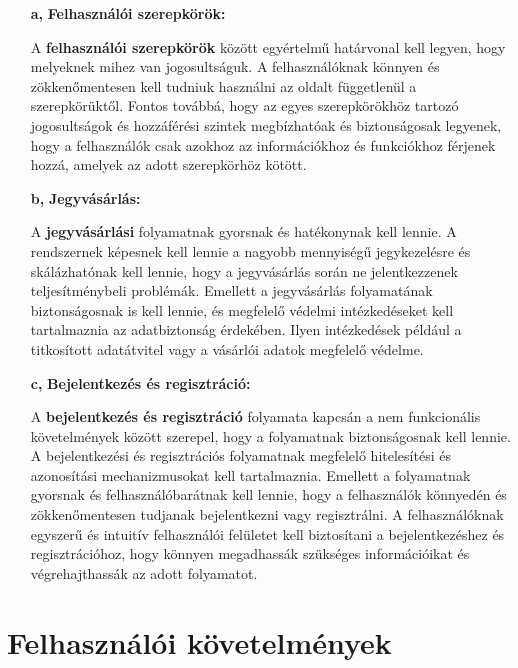 \begin{itemize}
  	\item[\textbf{a,}] \textbf{Felhasználói szerepkörök:}

A \textbf{felhasználói szerepkörök} között egyértelmű határvonal kell legyen, hogy melyeknek mihez van jogosultságuk. A felhasználóknak könnyen és zökkenőmentesen kell tudniuk használni az oldalt függetlenül a szerepkörüktől. Fontos továbbá, hogy az egyes szerepkörökhöz tartozó jogosultságok és hozzáférési szintek megbízhatóak és biztonságosak legyenek, hogy a felhasználók csak azokhoz az információkhoz és funkciókhoz férjenek hozzá, amelyek az adott szerepkörhöz kötött.

 	 \item[\textbf{b,}] \textbf{Jegyvásárlás:}

A \textbf{jegyvásárlási} folyamatnak gyorsnak és hatékonynak kell lennie. A rendszernek képesnek kell lennie a nagyobb mennyiségű jegykezelésre és skálázhatónak kell lennie, hogy a jegyvásárlás során ne jelentkezzenek teljesítménybeli problémák. Emellett a jegyvásárlás folyamatának biztonságosnak is kell lennie, és megfelelő védelmi intézkedéseket kell tartalmaznia az adatbiztonság érdekében. Ilyen intézkedések például a titkosított adatátvitel vagy a vásárlói adatok megfelelő védelme.

	 \item[\textbf{c,}] \textbf{Bejelentkezés és regisztráció:}

A \textbf{bejelentkezés és regisztráció} folyamata kapcsán a nem funkcionális követelmények között szerepel, hogy a folyamatnak biztonságosnak kell lennie. A bejelentkezési és regisztrációs folyamatnak megfelelő hitelesítési és azonosítási mechanizmusokat kell tartalmaznia. Emellett a folyamatnak gyorsnak és felhasználóbarátnak kell lennie, hogy a felhasználók könnyedén és zökkenőmentesen tudjanak bejelentkezni vagy regisztrálni. A felhasználóknak egyszerű és intuitív felhasználói felületet kell biztosítani a bejelentkezéshez és regisztrációhoz, hogy könnyen megadhassák szükséges információikat és végrehajthassák az adott folyamatot.
\end{itemize}


\section {Felhasználói követelmények}

